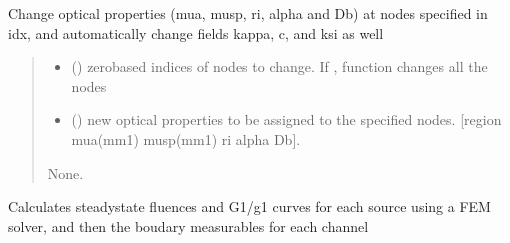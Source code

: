 \documentclass[letterpaper,10pt,english]{sphinxmanual}
\begin{document}
\begin{fulllineitems}
\begin{fulllineitems}
\label{\detokenize{_autosummary/nirfasterff.base.dcs_mesh.dcsmesh:nirfasterff.base.dcs_mesh.dcsmesh.change_prop}}
\pysigstartsignatures
{}
\pysigstopsignatures
\sphinxAtStartPar
Change optical properties (mua, musp, ri, alpha and Db) at nodes specified in idx, and automatically change fields kappa, c, and ksi as well
\begin{quote}\begin{description}
\begin{itemize}
\item {} 
\sphinxAtStartPar
{} () \textendash{} zero\sphinxhyphen{}based indices of nodes to change. If , function changes all the nodes

\item {} 
\sphinxAtStartPar
{} () \textendash{} new optical properties to be assigned to the specified nodes. {[}region mua(mm\sphinxhyphen{}1) musp(mm\sphinxhyphen{}1) ri alpha Db{]}.

\end{itemize}

\sphinxAtStartPar
None.

\end{description}\end{quote}

\end{fulllineitems}


\begin{fulllineitems}
\label{\detokenize{_autosummary/nirfasterff.base.dcs_mesh.dcsmesh:nirfasterff.base.dcs_mesh.dcsmesh.femdata}}
\pysigstartsignatures
{}
\pysigstopsignatures
\sphinxAtStartPar
Calculates steady\sphinxhyphen{}state fluences and G1/g1 curves for each source using a FEM solver, and then the boudary measurables for each channel


\end{fulllineitems}
\end{fulllineitems}
\end{document}
